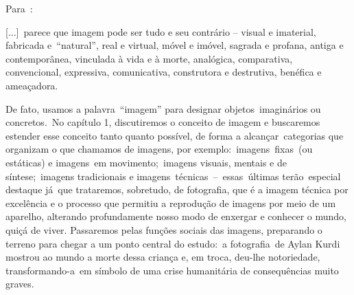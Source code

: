 \documentclass[
  letterpaper,
  a4paper,
  12pt]{scrbook}
\renewenvironment{quote}
  {\par\singlespacing\small\list{}{\rightmargin=0cm \leftmargin=4cm}%
   \item\relax}
  {\endlist}
\begin{document}
Para~\textcite{joly2012introducao}:

\begin{quote}
{[}...{]}~parece que imagem pode ser tudo e seu contrário -- visual e
imaterial, fabricada e~``natural'', real e virtual, móvel e imóvel,
sagrada e profana, antiga e contemporânea, vinculada à vida e à morte,
analógica, comparativa, convencional, expressiva, comunicativa,
construtora e destrutiva, benéfica e ameaçadora.
\autocite[pp.27]{joly2012introducao}~
\end{quote}

De fato, usamos a palavra~``imagem'' para designar objetos~imaginários
ou concretos.~No capítulo 1, discutiremos o conceito de imagem e
buscaremos estender esse conceito tanto quanto possível, de forma a
alcançar~categorias que organizam o que chamamos de imagens, por
exemplo:~imagens~fixas~(ou estáticas) e imagens~em movimento;~imagens
visuais, mentais e de síntese;~imagens tradicionais e
imagens~técnicas~--~essas~últimas terão~especial destaque já~que
trataremos, sobretudo, de fotografia, que é a imagem técnica por
excelência e o processo que permitiu a reprodução de imagens por meio de
um aparelho, alterando profundamente nosso modo de enxergar e conhecer o
mundo, quiçá de viver. Passaremos pelas funções sociais das imagens,
preparando o terreno para chegar a um ponto central do estudo:~a
fotografia~de Aylan Kurdi mostrou ao mundo a morte dessa criança e, em
troca, deu-lhe notoriedade, transformando-a~em símbolo de uma crise
humanitária de consequências muito graves.~
\end{document}
